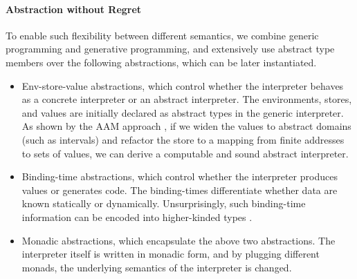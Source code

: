 \iffalse
embedded domain-specific languages \cite{DBLP:conf/snapl/RompfBLSJAOSKDK15,
DBLP:journals/jfp/CaretteKS09, DBLP:conf/icfp/GibbonsW14,
Hofer:2008:PED:1449913.1449935},
The key idea that enables this flexibility is to use abstract type members first
abstract over concrete/abstract components (e.g., concrete values or abstract
values), then as well as the binding-time of them (e.g., static or dynamic). By
staging, the overhead caused by the monadic layers is eliminated in the
generated code.
\fi

\paragraph{Abstraction without Regret}

To enable such flexibility between different semantics, we combine generic
programming and generative programming, and extensively use abstract type
members over the following abstractions, which can be later instantiated.

\begin{itemize}
\item Env-store-value abstractions, which control whether the interpreter
  behaves as a concrete interpreter or an abstract interpreter.
  The environments, stores, and values are initially declared as abstract types in the generic interpreter.
  As shown by the AAM approach \cite{DBLP:journals/jfp/HornM12,
  DBLP:conf/icfp/HornM10}, if we widen the values to abstract domains (such as
  intervals) and refactor the store to a mapping from finite addresses to sets of
  values, we can derive a computable and sound abstract interpreter.
\item Binding-time abstractions, which control whether the interpreter produces
  values or generates code. The binding-times differentiate whether data are 
  known statically or dynamically. Unsurprisingly, such binding-time
  information can be encoded into higher-kinded types 
    \cite{DBLP:journals/jfp/CaretteKS09, Ofenbeck:2017:SGP:3136040.3136060}.
\item Monadic abstractions, which encapsulate the above two abstractions.
  The interpreter itself is written in monadic form, and by plugging different monads, 
  the underlying semantics of the interpreter is changed.
\end{itemize}


